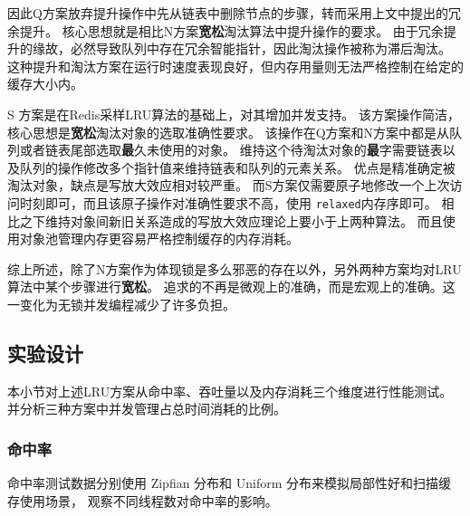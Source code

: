 因此Q方案放弃提升操作中先从链表中删除节点的步骤，转而采用上文中提出的冗余提升。
核心思想就是相比N方案\textbf{宽松}淘汰算法中提升操作的要求。
由于冗余提升的缘故，必然导致队列中存在冗余智能指针，因此淘汰操作被称为滞后淘汰。
这种提升和淘汰方案在运行时速度表现良好，但内存用量则无法严格控制在给定的缓存大小内。

S 方案是在Redis采样LRU算法的基础上，对其增加并发支持。
该方案操作简洁，核心思想是\textbf{宽松}淘汰对象的选取准确性要求。
该操作在Q方案和N方案中都是从队列或者链表尾部选取\textbf{最}久未使用的对象。
维持这个待淘汰对象的\textbf{最}字需要链表以及队列的操作修改多个指针值来维持链表和队列的元素关系。
优点是精准确定被淘汰对象，缺点是写放大效应相对较严重。
而S方案仅需要原子地修改一个上次访问时刻即可，而且该原子操作对准确性要求不高，使用 \verb|relaxed|内存序即可。
相比之下维持对象间新旧关系造成的写放大效应理论上要小于上两种算法。
而且使用对象池管理内存更容易严格控制缓存的内存消耗。

综上所述，除了N方案作为体现锁是多么邪恶的存在以外，另外两种方案均对LRU算法中某个步骤进行\textbf{宽松}。
追求的不再是微观上的准确，而是宏观上的准确。这一变化为无锁并发编程减少了许多负担。

\subsection{实验设计}

本小节对上述LRU方案从命中率、吞吐量以及内存消耗三个维度进行性能测试。
并分析三种方案中并发管理占总时间消耗的比例。

\subsubsection{命中率}

命中率测试数据分别使用 Zipfian 分布和 Uniform 分布来模拟局部性好和扫描缓存使用场景，
观察不同线程数对命中率的影响。




